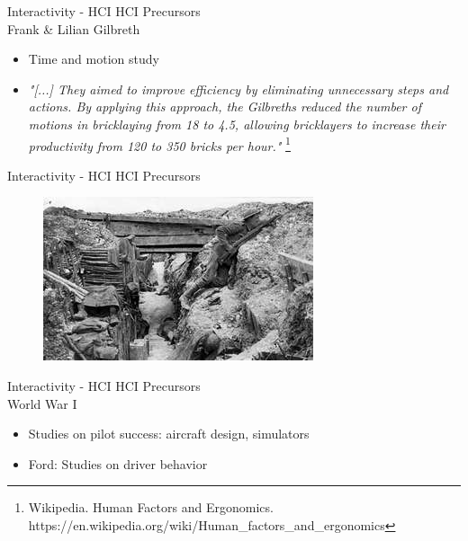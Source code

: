 \documentclass{beamer}
\newcommand\blfootnote[1]{%
  \begingroup
  \renewcommand\thefootnote{}\footnote{#1}%
  \addtocounter{footnote}{-1}%
  \endgroup
}
\begin{document}
\begin{frame}{Interactivity - HCI} 
    HCI Precursors\\
    \vspace{5mm}
    Frank \& Lilian Gilbreth\\ 
    \begin{itemize}
        \item Time and motion study
        \item \textit{"[...] They aimed to improve efficiency by eliminating unnecessary steps and actions. By applying this approach, the Gilbreths reduced the number of motions in bricklaying from 18 to 4.5, allowing bricklayers to increase their productivity from 120 to 350 bricks per hour."}\blfootnote{Wikipedia. Human Factors and Ergonomics. https://en.wikipedia.org/wiki/Human\_factors\_and\_ergonomics}
    \end{itemize}
\end{frame}

\begin{frame}{Interactivity - HCI} 
    HCI Precursors
    \begin{figure}[h]
        \includegraphics[width=\textwidth]{ww1.jpg}
    \end{figure}
\end{frame}

\begin{frame}{Interactivity - HCI} 
    HCI Precursors\\
    \vspace{5mm}
    World War I\\ 
    \begin{itemize}
        \item Studies on pilot success: aircraft design, simulators
        \item Ford: Studies on driver behavior
    \end{itemize}
\end{frame}
\end{document}
